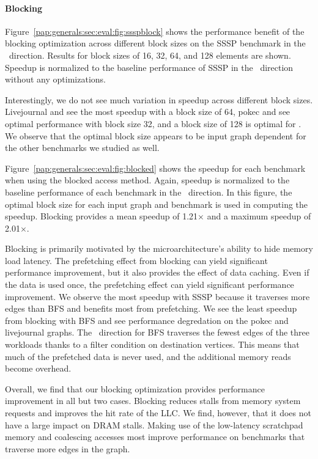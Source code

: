 \paragraph{Blocking}
\blockSSSPFigure
 
\allBlockedFigure
 
Figure~\ref{pap:generals:sec:eval:fig:ssspblock} shows the performance benefit of the blocking optimization across different block sizes on the SSSP benchmark in the \pull~direction. Results for block sizes of 16, 32, 64, and 128 elements are shown.
Speedup is normalized to the baseline performance of SSSP in the \pull~direction without any optimizations.
 
Interestingly, we do not see much variation in speedup across different block sizes. 
Livejournal and  see the most speedup with a block size of 64, pokec and  see optimal performance with block size 32, and a block size of 128 is optimal for . 
We observe that the optimal block size appears to be input graph dependent for the other benchmarks we studied as well. 
 
Figure~\ref{pap:generals:sec:eval:fig:blocked} shows the speedup for each benchmark when using the blocked access method. 
Again, speedup is normalized to the baseline performance of each benchmark in the \pull~direction.
In this figure, the optimal block size for each input graph and benchmark is used in computing the speedup. 
Blocking provides a mean speedup of 1.21$\times$ and a maximum speedup of 2.01$\times$. 
 
Blocking is primarily motivated by the microarchitecture's ability to hide memory load latency.
The prefetching effect from blocking can yield significant performance improvement, but it also provides the effect of data caching.
Even if the data is used once, the prefetching effect can yield significant performance improvement. 
We observe the most speedup with SSSP because it traverses more edges than BFS and benefits most from prefetching.
We see the least speedup from blocking with BFS and see performance degredation on the pokec and livejournal graphs.
The \pull~direction for BFS traverses the fewest edges of the three workloads thanks to a filter condition on destination vertices.
This means that much of the prefetched data is never used, and the additional memory reads become overhead.

Overall, we find that our blocking optimization provides performance improvement in all but two cases. 
Blocking reduces stalls from memory system requests and improves the hit rate of the LLC. We find, however, that it does not have a large impact on DRAM stalls.
Making use of the low-latency scratchpad memory and coalescing accesses most improve performance on benchmarks that traverse more edges in the graph. 
 
